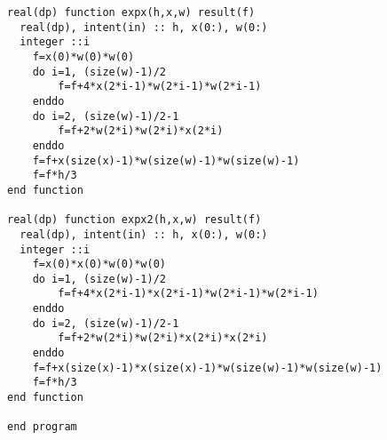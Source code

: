 \begin{code}
\begin{lstlisting}
real(dp) function expx(h,x,w) result(f)
  real(dp), intent(in) :: h, x(0:), w(0:)
  integer ::i
    f=x(0)*w(0)*w(0)
    do i=1, (size(w)-1)/2
        f=f+4*x(2*i-1)*w(2*i-1)*w(2*i-1)
    enddo
    do i=2, (size(w)-1)/2-1
        f=f+2*w(2*i)*w(2*i)*x(2*i)
    enddo
    f=f+x(size(x)-1)*w(size(w)-1)*w(size(w)-1)
    f=f*h/3
end function 
        
real(dp) function expx2(h,x,w) result(f)
  real(dp), intent(in) :: h, x(0:), w(0:)
  integer ::i
    f=x(0)*x(0)*w(0)*w(0)
    do i=1, (size(w)-1)/2
        f=f+4*x(2*i-1)*x(2*i-1)*w(2*i-1)*w(2*i-1)
    enddo
    do i=2, (size(w)-1)/2-1
        f=f+2*w(2*i)*w(2*i)*x(2*i)*x(2*i)
    enddo
    f=f+x(size(x)-1)*x(size(x)-1)*w(size(w)-1)*w(size(w)-1)
    f=f*h/3
end function 

end program



\end{lstlisting}
\end{code}
